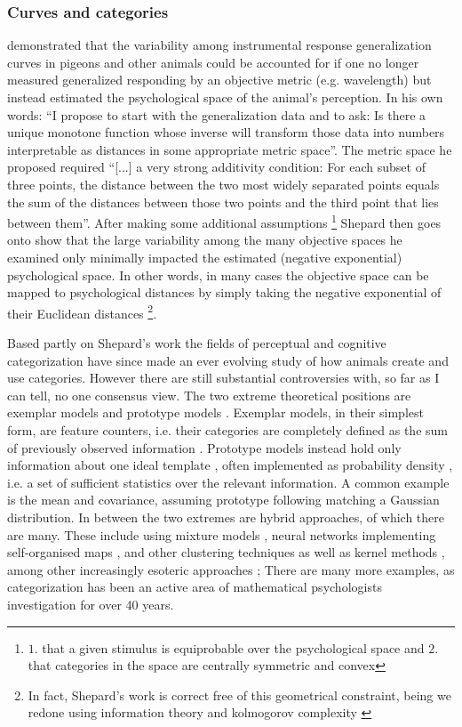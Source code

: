 \documentclass[doc,12pt]{apa}        %
\begin{document}
\subsubsection{Curves and categories}
\label{subsub:curves}
 demonstrated that the variability among instrumental response generalization curves in pigeons and other animals could be accounted for if one no longer measured generalized responding by an objective metric (e.g. wavelength) but instead estimated the psychological space of the animal's perception.  In his own words: ``I propose to start with the generalization data and to ask: Is there a unique monotone function whose inverse will transform those data into numbers interpretable as distances in some appropriate metric space''. The metric space he proposed required ``[...] a very strong additivity condition: For each subset of three points, the distance between the two most widely separated points equals the sum of the distances between those two points and the third point that lies between them''.  After making some additional assumptions
\footnote{
    $1.$ that a given stimulus is equiprobable over the psychological space and $2.$ that categories in the space are centrally symmetric and convex
} Shepard then goes onto show that the large variability among the many objective spaces he examined only minimally impacted the estimated (negative exponential) psychological space.  In other words, in many cases the objective space can be mapped to psychological distances by simply taking the negative exponential of their Euclidean distances
\footnote{
    In fact, Shepard's work is correct free of this geometrical constraint, being we redone using information theory and kolmogorov complexity \cite{Chatera:2003p9103}}.

Based partly on Shepard's work the fields of perceptual and cognitive categorization have since made an ever evolving study of how animals create and use categories.  However there are still substantial controversies with, so far as I can tell, no one consensus view.  The two extreme theoretical positions are exemplar models and prototype models \cite{Ashby:2005p4764}.  Exemplar models, in their simplest form, are feature counters, i.e. their categories are completely defined as the sum of previously observed information \cite{Nosofsky:1988p9104}.  Prototype models instead hold only information about one ideal template \cite{Rosch:1973p9108}, often implemented as probability density \cite{Ashby:1995p9109}, i.e. a set of sufficient statistics over the relevant information.  A common example is the mean and covariance, assuming prototype following matching a Gaussian distribution.  In between the two extremes are hybrid approaches, of which there are many.  These include using mixture models \cite{Rossee:2002p9112}, neural networks implementing self-organised maps \cite{Love:2004p9110}, and other clustering techniques \cite{Kruschke:2012p9111} as well as kernel methods \cite{Jakel:2008p9113}, among other increasingly esoteric approaches \cite{Martin:2012p9185}; There are many more examples, as categorization has been an active area of mathematical psychologists investigation for over 40 years.
\end{document}
